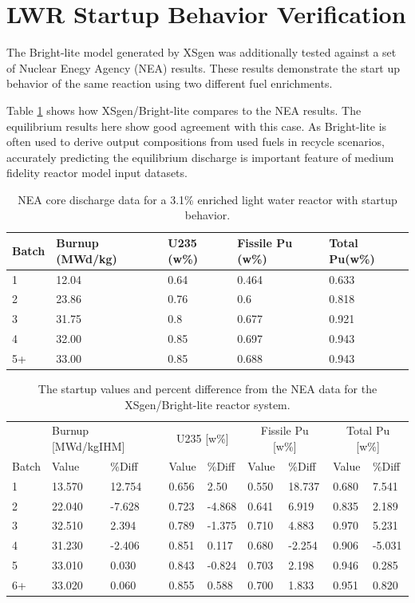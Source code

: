 \documentclass{article}
\begin{document}
\section{LWR Startup Behavior Verification}
\label{sec:startupv}
The Bright-lite model generated by XSgen was additionally tested against a set of
Nuclear Enegy Agency (NEA) results\cite{nea}. These results demonstrate the start up behavior
of the same reaction using two different fuel enrichments.

Table \ref{tab:b} shows how XSgen/Bright-lite compares to the NEA results.
The equilibrium results here show good agreement with this case. As Bright-lite is often
used to derive output compositions from used fuels in recycle scenarios, accurately
predicting the equilibrium discharge is important feature of medium fidelity reactor model
input datasets.

\begin{table}[!htb]
\centering
\caption{NEA core discharge data for a 3.1\% enriched light water reactor with startup behavior.}
\label{tab:b}
\begin{tabular}{lllll}
Batch & Burnup (MWd/kg) & U235 (w\%) & Fissile Pu (w\%) & Total Pu(w\%) \\
\hline
1 & 12.04 & 0.64 & 0.464 & 0.633 \\
2 & 23.86 & 0.76 & 0.6 & 0.818 \\
3 & 31.75 & 0.8 & 0.677 & 0.921 \\
4 & 32.00 & 0.85 & 0.697 & 0.943 \\
5+ & 33.00 & 0.85 & 0.688 & 0.943
\end{tabular}
\end{table}

\begin{table}[!htb]
\centering
\caption{The startup values and percent difference from the NEA data for the XSgen/Bright-lite reactor system.}
\label{tab:c}
\begin{tabular}{l| ll| ll| ll| ll}
 & \multicolumn{2}{p{1cm}}{Burnup [MWd/kgIHM]} & \multicolumn{2}{c}{U235 [w\%]} & \multicolumn{2}{c}{Fissile Pu [w\%]} & \multicolumn{2}{c}{Total Pu [w\%]} \\
Batch & Value & \%Diff & Value & \%Diff & Value & \%Diff & Value & \%Diff \\
\hline
1 & 13.570 & 12.754 & 0.656 & 2.50 & 0.550 & 18.737 & 0.680 & 7.541 \\
2 & 22.040 & -7.628 & 0.723 & -4.868 & 0.641 & 6.919 & 0.835 & 2.189 \\
3 & 32.510 & 2.394 & 0.789 & -1.375 & 0.710 & 4.883 & 0.970 & 5.231 \\
4 & 31.230 & -2.406 & 0.851 & 0.117 & 0.680 & -2.254 & 0.906 & -5.031 \\
5 & 33.010 & 0.030 & 0.843 & -0.824 & 0.703 & 2.198 & 0.946 & 0.285 \\
6+ & 33.020 & 0.060 & 0.855 & 0.588 & 0.700 & 1.833 & 0.951 & 0.820
\end{tabular}
\end{table}
\end{document}
